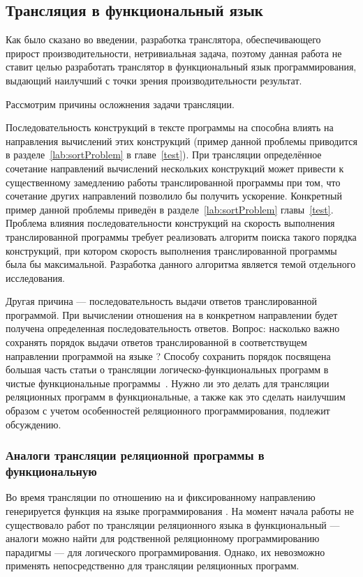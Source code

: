\subsection{Трансляция в функциональный язык}

Как было сказано во введении, разработка транслятора, обеспечивающего прирост производительности, нетривиальная задача, поэтому данная работа не ставит целью разработать транслятор в функциональный язык программирования, выдающий наилучший с точки зрения производительности результат.

Рассмотрим причины осложнения задачи трансляции.

Последовательность конструкций в тексте программы на \miniKanren{} способна влиять на направления вычислений этих конструкций (пример данной проблемы приводится в разделе~\ref{lab:sortProblem} в главе~\ref{test}).
При трансляции определённое сочетание направлений вычислений нескольких конструкций может привести к существенному замедлению работы транслированной программы при том, что сочетание других направлений позволило бы получить ускорение.
Конкретный пример данной проблемы приведён в разделе~\ref{lab:sortProblem} главы~\ref{test}.
Проблема влияния последовательности конструкций на скорость выполнения транслированной программы требует реализовать алгоритм поиска такого порядка конструкций, при котором скорость выполнения транслированной программы была бы максимальной.
Разработка данного алгоритма является темой отдельного исследования.

Другая причина --- последовательность выдачи ответов транслированной программой.
При вычислении отношения на \miniKanren{} в конкретном направлении будет получена определенная последовательность ответов.
Вопрос: насколько важно сохранять порядок выдачи ответов транслированной в соответствущем направлении программой на языке \haskell{}?
Способу сохранить порядок посвящена большая часть статьи о трансляции логическо-функциональных программ в чистые функциональные программы~\cite{Brassel2008FFL}.
Нужно ли это делать для трансляции реляционных программ в функциональные, а также как это сделать наилучшим образом с учетом особенностей реляционного программирования, подлежит обсуждению.

\subsubsection{Аналоги трансляции реляционной программы в функциональную}

Во время трансляции по отношению на \miniKanren{} и фиксированному направлению генерируется функция на языке программирования \haskell{}.
На момент начала работы не существовало работ по трансляции реляционного языка в функциональный --- аналоги можно найти для родственной реляционному программированию парадигмы --- для логического программирования.
Однако, их невозможно применять непосредственно для трансляции реляционных программ.

